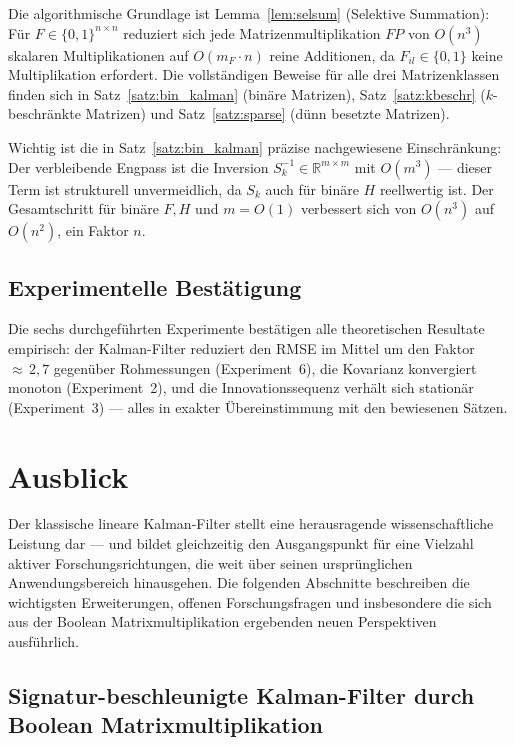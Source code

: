 ﻿\documentclass[a4paper,12pt]{article}
\theoremstyle{definition}
\begin{document}
Die algorithmische Grundlage ist Lemma~\ref{lem:selsum} (Selektive Summation):
Für $F \in \{0,1\}^{n\times n}$ reduziert sich jede Matrizenmultiplikation
$FP$ von $O(n^3)$ skalaren Multiplikationen auf $O(m_F \cdot n)$ reine Additionen,
da $F_{il} \in \{0,1\}$ keine Multiplikation erfordert. Die vollständigen Beweise
für alle drei Matrizenklassen finden sich in Satz~\ref{satz:bin_kalman}
(binäre Matrizen), Satz~\ref{satz:kbeschr} ($k$-beschränkte Matrizen) und
Satz~\ref{satz:sparse} (dünn besetzte Matrizen).

Wichtig ist die in Satz~\ref{satz:bin_kalman} präzise nachgewiesene Einschränkung:
Der verbleibende Engpass ist die Inversion $S_k^{-1} \in \mathbb{R}^{m\times m}$
mit $O(m^3)$ --- dieser Term ist strukturell unvermeidlich, da $S_k$ auch für
binäre $H$ reellwertig ist. Der Gesamtschritt für binäre $F, H$ und $m = O(1)$
verbessert sich von $O(n^3)$ auf $O(n^2)$, ein Faktor $n$.

\subsection{Experimentelle Bestätigung}

Die sechs durchgeführten Experimente bestätigen alle theoretischen Resultate empirisch:
der Kalman-Filter reduziert den RMSE im Mittel um den Faktor ${\approx}\,2{,}7$
gegenüber Rohmessungen (Experiment~6), die Kovarianz konvergiert monoton
(Experiment~2), und die Innovationssequenz verhält sich stationär (Experiment~3) ---
alles in exakter Übereinstimmung mit den bewiesenen Sätzen.

\section{Ausblick}

Der klassische lineare Kalman-Filter stellt eine herausragende wissenschaftliche
Leistung dar --- und bildet gleichzeitig den Ausgangspunkt für eine Vielzahl
aktiver Forschungsrichtungen, die weit über seinen ursprünglichen Anwendungsbereich
hinausgehen. Die folgenden Abschnitte beschreiben die wichtigsten Erweiterungen,
offenen Forschungsfragen und insbesondere die sich aus der Boolean Matrixmultiplikation
\cite{epp2026boolmm} ergebenden neuen Perspektiven ausführlich.

\subsection{Signatur-beschleunigte Kalman-Filter durch Boolean Matrixmultiplikation}
\end{document}
